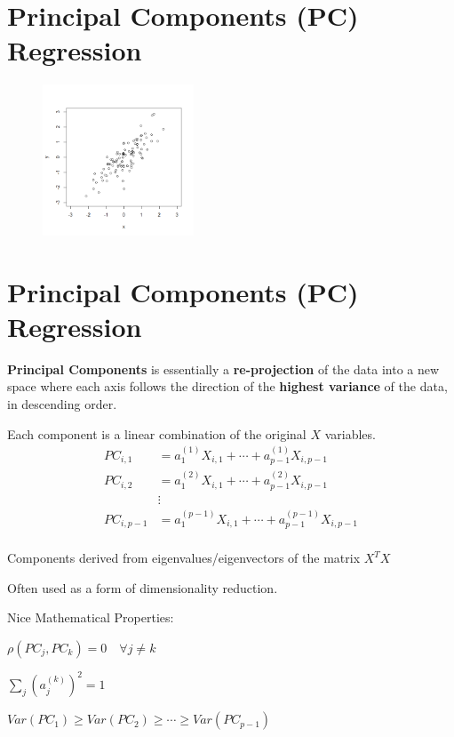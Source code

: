 \documentclass[12pt]{../notes}
\begin{document}

\section{Principal Components (PC) Regression}
\begin{figure}[H]
\centering
\includegraphics[width=0.4\textwidth]{../figures/module7/pc_scatter.png}
\end{figure}

\section{Principal Components (PC) Regression}
\textbf{Principal Components} is essentially a \textbf{re-projection} of the data into a new space where each axis follows the direction of the \textbf{highest variance} of the data, in descending order. 
\bi
\item Each component is a linear combination of the original $X$ variables. 
\begin{align*}
PC_{i, 1} &= a_1^{(1)}X_{i, 1} + \cdots + a^{(1)}_{p-1}X_{i, p-1} \\
PC_{i, 2} &= a_1^{(2)}X_{i, 1} + \cdots + a^{(2)}_{p-1}X_{i, p-1} \\
& \vdots \\
PC_{i, p-1} &= a_1^{(p-1)}X_{i, 1} + \cdots + a^{(p-1)}_{p-1}X_{i, p-1} \\
\end{align*}
\item Components derived from eigenvalues/eigenvectors of the matrix $X^TX$
\item Often used as a form of dimensionality reduction. 
\ei

Nice Mathematical Properties:
\bi
\item $\rho(PC_j, PC_k) = 0 \quad \forall j \ne k$
\item $\sum_j\left(a_j^{(k)}\right)^2 = 1$
\item $Var(PC_1) \ge Var(PC_2) \ge \cdots \ge Var(PC_{p-1})$
\ei
\end{document}

